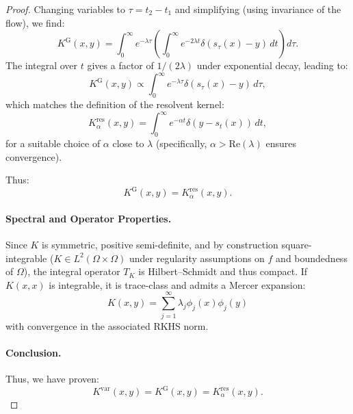 \documentclass[11pt]{article}
\theoremstyle{plain}
\def\[{\begin{equation}}
\def\]{\end{equation}}
\begin{document}
\begin{proof}
Changing variables to $\tau = t_2 - t_1$ and simplifying (using invariance of the flow), we find:
\[
K^{\mathrm{G}}(x, y) = \int_0^\infty e^{-\lambda \tau} \left( \int_0^\infty e^{-2\lambda t} \delta(s_\tau(x) - y) \, dt \right) d\tau.
\]
The integral over $t$ gives a factor of $1/(2\lambda)$ under exponential decay, leading to:
\[
K^{\mathrm{G}}(x, y) \propto \int_0^\infty e^{-\lambda \tau} \delta(s_\tau(x) - y) \, d\tau,
\]
which matches the definition of the resolvent kernel:
\[
K^{\mathrm{res}}_\alpha(x, y) = \int_0^\infty e^{-\alpha t} \delta(y - s_t(x)) \, dt,
\]
for a suitable choice of $\alpha$ close to $\lambda$ (specifically, $\alpha > \mathrm{Re}(\lambda)$ ensures convergence).

Thus:
\[
K^{\mathrm{G}}(x, y) = K^{\mathrm{res}}_\alpha(x, y).
\]

\paragraph{Spectral and Operator Properties.}
Since $K$ is symmetric, positive semi-definite, and by construction square-integrable ($K \in L^2(\Omega \times \Omega)$ under regularity assumptions on $f$ and boundedness of $\Omega$), the integral operator $T_K$ is Hilbert–Schmidt and thus compact. If $K(x, x)$ is integrable, it is trace-class and admits a Mercer expansion:
\[
K(x, y) = \sum_{j=1}^\infty \lambda_j \phi_j(x) \phi_j(y)
\]
with convergence in the associated RKHS norm.

\paragraph{Conclusion.}
Thus, we have proven:
\[
K^{\mathrm{var}}(x, y) = K^{\mathrm{G}}(x, y) = K^{\mathrm{res}}_\alpha(x, y).
\]
\end{proof}





\end{document}
